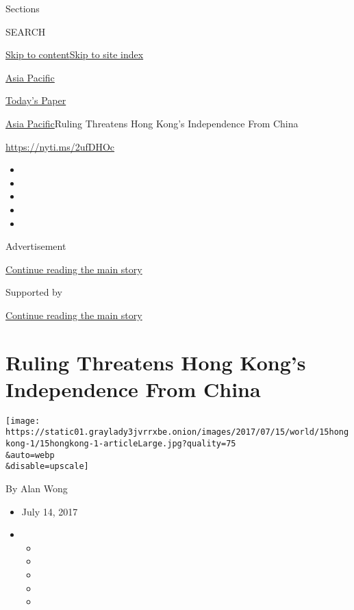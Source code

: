 Sections

SEARCH

\protect\hyperlink{site-content}{Skip to
content}\protect\hyperlink{site-index}{Skip to site index}

\href{https://www.nytimes3xbfgragh.onion/section/world/asia}{Asia
Pacific}

\href{https://myaccount.nytimes3xbfgragh.onion/auth/login?response_type=cookie\&client_id=vi}{}

\href{https://www.nytimes3xbfgragh.onion/section/todayspaper}{Today's
Paper}

\href{/section/world/asia}{Asia Pacific}\textbar{}Ruling Threatens Hong
Kong's Independence From China

\url{https://nyti.ms/2ufDHOc}

\begin{itemize}
\item
\item
\item
\item
\item
\end{itemize}

Advertisement

\protect\hyperlink{after-top}{Continue reading the main story}

Supported by

\protect\hyperlink{after-sponsor}{Continue reading the main story}

\hypertarget{ruling-threatens-hong-kongs-independence-from-china}{%
\section{Ruling Threatens Hong Kong's Independence From
China}\label{ruling-threatens-hong-kongs-independence-from-china}}

\texttt{[image: https://static01.graylady3jvrrxbe.onion/images/2017/07/15/world/15hongkong-1/15hongkong-1-articleLarge.jpg?quality=75\\\&auto=webp\\\&disable=upscale]}

By Alan Wong

\begin{itemize}
\item
  July 14, 2017
\item
  \begin{itemize}
  \item
  \item
  \item
  \item
  \item
  \end{itemize}
\end{itemize}

